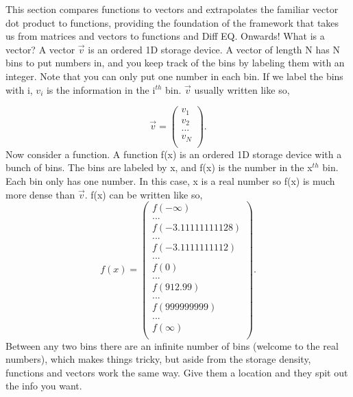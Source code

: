 \documentclass[12pt]{article}
\begin{document}
This section compares functions to vectors and extrapolates the familiar vector dot product to functions, providing the foundation of the framework that takes us from matrices and vectors to functions and Diff EQ. Onwards! What is a vector? A vector $\vec{v}$ is an ordered 1D storage device. A vector of length N has N bins to put numbers in, and you keep track of the bins by labeling them with an integer. Note that you can only put one number in each bin. If we label the bins with i, $v_i$ is the information in the i$^{th}$ bin. $\vec{v}$ usually written like so, 

\begin{equation}
\vec{v} = 
\begin{pmatrix}
v_1 \\
v_2 \\
... \\
v_N \\
\end{pmatrix}.
\end{equation}
Now consider a function. A function f(x) is an ordered 1D storage device with a bunch of bins. The bins are labeled by x, and f(x) is the number in the x$^{th}$ bin. Each bin only has one number. In this case, x is a real number so f(x) is much more dense than $\vec{v}$. f(x) can be written like so,  
\begin{equation}
f(x) = 
\begin{pmatrix}
f(-\infty) \\
... \\
f(-3.11111111128) \\
... \\
f(-3.1111111112) \\
... \\
f(0) \\
... \\
f(912.99) \\
... \\
f(999999999) \\
... \\
f(\infty) \\
\end{pmatrix}.
\end{equation}
Between any two bins there are an infinite number of bins (welcome to the real numbers), which makes things tricky, but aside from the storage density, functions and vectors work the same way. Give them a location and they spit out the info you want. 
\end{document}

